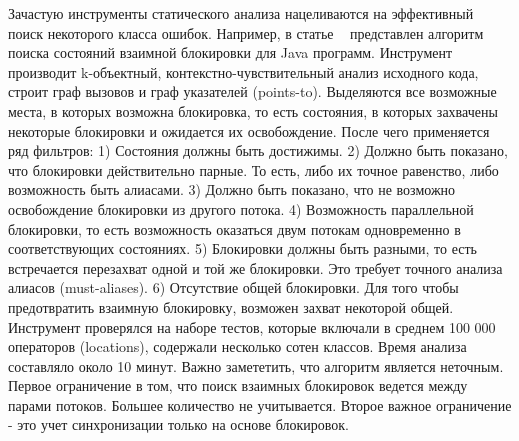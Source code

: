 Зачастую инструменты статического анализа нацеливаются на эффективный поиск некоторого класса ошибок. Например, в статье ~\cite{Naik:2009} представлен алгоритм поиска состояний взаимной блокировки для Java программ. Инструмент производит k-объектный, контекстно-чувствительный анализ исходного кода, строит граф вызовов и граф указателей (points-to). Выделяются все возможные места, в которых возможна блокировка, то есть состояния, в которых захвачены некоторые блокировки и ожидается их освобождение. После чего применяется ряд фильтров:
1) Состояния должны быть достижимы.
2) Должно быть показано, что блокировки действительно парные. То есть, либо их точное равенство, либо возможность быть алиасами.
3) Должно быть показано, что не возможно освобождение блокировки из другого потока. 
4) Возможность параллельной блокировки, то есть возможность оказаться двум потокам одновременно в соответствующих состояниях.
5) Блокировки должны быть разными, то есть встречается перезахват одной и той же блокировки. Это требует точного анализа алиасов (must-aliases).
6) Отсутствие общей блокировки. Для того чтобы предотвратить взаимную блокировку, возможен захват некоторой общей.
Инструмент проверялся на наборе тестов, которые включали в среднем 100 000 операторов (locations), содержали несколько сотен классов. Время анализа составляло около 10 минут. Важно замететить, что алгоритм является неточным. Первое ограничение в том, что поиск взаимных блокировок ведется между парами потоков. Большее количество не учитывается. Второе важное ограничение - это учет синхронизации только на основе блокировок.

